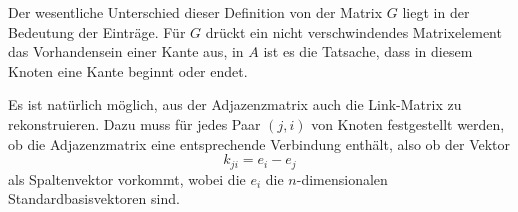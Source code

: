 Der wesentliche Unterschied dieser Definition von der Matrix $G$
liegt in der Bedeutung der Einträge.
Für $G$ drückt ein nicht verschwindendes Matrixelement das Vorhandensein
einer Kante aus, in $A$ ist es die Tatsache, dass in diesem Knoten
eine Kante beginnt oder endet.

Es ist natürlich möglich, aus der Adjazenzmatrix auch die Link-Matrix
zu rekonstruieren.
Dazu muss für jedes Paar $(j,i)$ von Knoten festgestellt werden,
ob die Adjazenzmatrix eine entsprechende Verbindung enthält, also ob der
Vektor 
\[
k_{ji} = e_i - e_j
\]
als Spaltenvektor vorkommt, wobei die $e_i$ die $n$-dimensionalen
Standardbasisvektoren sind.


